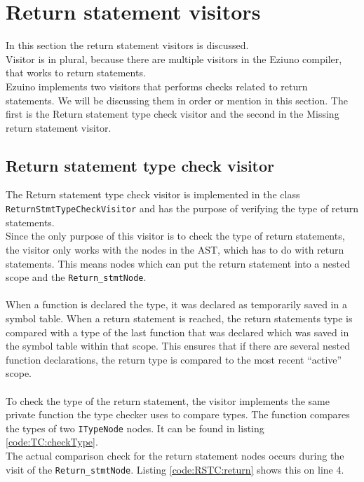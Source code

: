 \section{Return statement visitors}
In this section the return statement visitors is discussed.\\
Visitor is in plural, because there are multiple visitors in the Eziuno compiler, that works to return statements.\\
Ezuino implements two visitors that performs checks related to return statements. We will be discussing them in order or mention in this section. The first is the Return statement type check visitor and the second in the Missing return statement visitor.

\subsection{Return statement type check visitor}
The Return statement type check visitor is implemented in the class \texttt{ReturnStmtTypeCheckVisitor} and has the purpose of verifying the type of return statements.\\
Since the only purpose of this visitor is to check the type of return statements, the visitor only works with the nodes in the AST, which has to do with return statements. This means nodes which can put the return statement into a nested scope and the \texttt{Return\_stmtNode}.
\\\\
When a function is declared the type, it was declared as temporarily saved in a symbol table. When a return statement is reached, the return statements type is compared with a type of the last function that was declared which was saved in the symbol table within that scope. This ensures that if there are several nested function declarations, the return type is compared to the most recent “active” scope.
\\\\
To check the type of the return statement, the visitor implements the same private function the type checker uses to compare types. The function compares the types of two \texttt{ITypeNode} nodes. It can be found in listing \ref{code:TC:checkType}.\\
The actual comparison check for the return statement nodes occurs during the visit of the \texttt{Return\_stmtNode}. Listing \ref{code:RSTC:return} shows this on line 4.

\noindent

